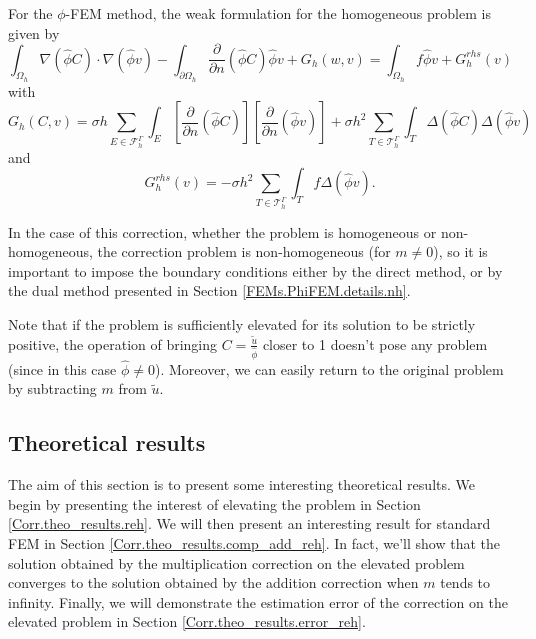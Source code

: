 For the $\phi$-FEM method, the weak formulation for the homogeneous problem is given by
\begin{equation*}
	\int_{\Omega_h} \nabla (\hat{\phi} C) \cdot \nabla (\hat{\phi} v) - \int_{\partial\Omega_h} \frac{\partial}{\partial n}(\hat{\phi} C)\hat{\phi} v+G_h(w,v)=\int_{\Omega_h} f \hat{\phi} v + G_h^{rhs}(v)
\end{equation*}
with
\begin{equation*}
	G_h(C,v)=\sigma h\sum_{E\in\mathcal{F}_h^\Gamma} \int_E \left[\frac{\partial}{\partial n}(\hat{\phi} C)\right] \left[\frac{\partial}{\partial n}(\hat{\phi} v)\right]+\sigma h^2\sum_{T\in\mathcal{T}_h^\Gamma} \int_{T} \Delta(\hat{\phi} C)\Delta(\hat{\phi} v)
\end{equation*}
and
\begin{equation*}
	G_h^{rhs}(v)=-\sigma h^2\sum_{T\in\mathcal{T}_h^\Gamma} \int_{T} f \Delta(\hat{\phi} v).
\end{equation*}

In the case of this correction, whether the problem is homogeneous or non-homogeneous, the correction problem is non-homogeneous (for $m\ne 0$), so it is important to impose the boundary conditions either by the direct method, or by the dual method presented in Section \ref{FEMs.PhiFEM.details.nh}.

\begin{Rem}
	Note that if the problem is sufficiently elevated for its solution to be strictly positive, the operation of bringing $C=\frac{\tilde{u}}{\hat{\phi}}$ closer to 1 doesn't pose any problem (since in this case $\hat{\phi}\ne 0$). Moreover, we can easily return to the original problem by subtracting $m$ from $\tilde{u}$.
\end{Rem}

\subsection{Theoretical results} \label{Corr.theo_results}

The aim of this section is to present some interesting theoretical results. We begin by presenting the interest of elevating the problem in Section \ref{Corr.theo_results.reh}. We will then present an interesting result for standard FEM in Section \ref{Corr.theo_results.comp_add_reh}. In fact, we'll show that the solution obtained by the multiplication correction on the elevated problem converges to the solution obtained by the addition correction when $m$ tends to infinity. Finally, we will demonstrate the estimation error of the correction on the elevated problem in Section \ref{Corr.theo_results.error_reh}.


